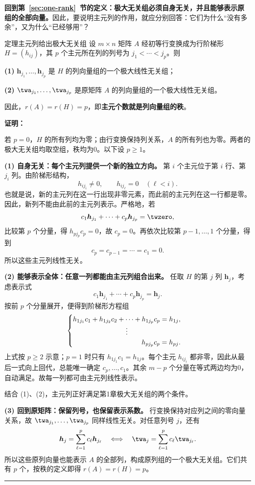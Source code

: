 \documentclass[a4paper,12pt,twoside,openany,fontset=none]{ctexbook}
\renewcommand{\ge}{\geqslant}
\let\oldsum\sum
\renewcommand{\sum}{\displaystyle\oldsum}
\newcounter{theorem}[chapter]
\newenvironment{theorem}[1][]{\begin{thmBox}{定理}{#1}}{\end{thmBox}}
\renewenvironment{proof}{
    \par\vspace{0.5em}\noindent
    \textbf{\color{LogicColor} 证明：}
}{
    \hfill \textcolor{LogicColor}{\rule{0.6em}{0.6em}} \par
}
\numberwithin{equation}{chapter}
\begin{document}
\textbf{回到第~\ref{sec:one-rank}~节的定义：极大无关组必须自身无关，并且能够表示原组的全部向量。}因此，要说明主元列的作用，就应分别回答：它们为什么“没有多余”，又为什么“已经够用”？

\begin{theorem}[主元列给出极大无关组]
设 $m\times n$ 矩阵 $A$ 经初等行变换成为行阶梯形 $H=(h_{ij})$，其 $p$ 个主元所在列的列号为 $j_1<\cdots<j_p$。则

\textbf{(1)} $\boldsymbol h_{j_1},\ldots,\boldsymbol h_{j_p}$ 是 $H$ 的列向量组的一个极大线性无关组；

\textbf{(2)} $\twa_{j_1},\ldots,\twa_{j_p}$ 是原矩阵 $A$ 的列向量组的一个极大线性无关组。

因此，$r(A)=r(H)=p$，即\textbf{主元个数就是列向量组的秩}。
\end{theorem}

\begin{proof}
若 $p=0$，$H$ 的所有列均为零；由行变换保持列关系，$A$ 的所有列也为零。两者的极大无关组均取空组，秩均为0。以下设 $p\ge1$。

\textbf{(1) 自身无关：每个主元列提供一个新的独立方向。}
第 $i$ 个主元位于第 $i$ 行、第 $j_i$ 列。由阶梯形结构，
\[
    h_{i j_i}\ne0,\qquad h_{i j_\ell}=0\quad(\ell<i).
\]
也就是说，新的主元列在这一行出现非零元素，而此前的主元列在这一行都是零。因此，新列不能由此前的主元列表示。严格地，若
\[
    c_1\boldsymbol h_{j_1}+\cdots+c_p\boldsymbol h_{j_p}=\twzero,
\]
比较第 $p$ 个分量，得 $h_{p j_p}c_p=0$，故 $c_p=0$。再依次比较第 $p-1,\ldots,1$ 个分量，得到
\[
    c_p=c_{p-1}=\cdots=c_1=0.
\]
所以这些主元列线性无关。

\textbf{(2) 能够表示全体：任意一列都能由主元列组合出来。}
任取 $H$ 的第 $j$ 列 $\boldsymbol h_j$，考虑表示式
\[
    c_1\boldsymbol h_{j_1}+\cdots+c_p\boldsymbol h_{j_p}=\boldsymbol h_j.
\]
按前 $p$ 个分量展开，便得到阶梯形方程组
\[
\begin{cases}
 h_{1j_1}c_1+h_{1j_2}c_2+\cdots+h_{1j_p}c_p=h_{1j},\\
 \hfill\vdots\hfill\\
 \hfill h_{pj_p}c_p=h_{pj}.
\end{cases}
\]
上式按 $p\ge2$ 示意；$p=1$ 时只有 $h_{1j_1}c_1=h_{1j}$。每个主元 $h_{i j_i}$ 都非零，因此从最后一式向上回代，总能唯一确定 $c_p,\ldots,c_1$。其余 $m-p$ 个分量在等式两边均为0，自动满足。故每一列都可由主元列线性表示。

结合 (1)、(2)，主元列正好满足第1章极大无关组的两个条件。

\textbf{(3) 回到原矩阵：保留列号，也保留表示系数。}
行变换保持对应列之间的零向量关系，故 $\twa_{j_1},\ldots,\twa_{j_p}$ 同样线性无关。对任意列号 $j$，还有
\[
    \boldsymbol h_j=\sum_{\ell=1}^{p}c_\ell\boldsymbol h_{j_\ell}
    \quad\Longleftrightarrow\quad
    \twa_j=\sum_{\ell=1}^{p}c_\ell\twa_{j_\ell}.
\]
所以这些原列向量也能表示 $A$ 的全部列，构成原列组的一个极大无关组。它们共有 $p$ 个，按秩的定义即得 $r(A)=r(H)=p$。
\end{proof}
\end{document}
